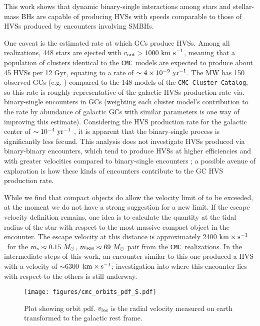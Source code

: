 \documentclass[twocolumn]{aastex631}
\newcommand{\kms}{${\rm km \times s^{-1}}$}
\newcommand{\CMC}{\texttt{CMC}}
\newcommand{\CMCcat}{\texttt{CMC Cluster Catalog}}
\begin{document}
This work shows that dynamic binary-single interactions among stars and stellar-mass BHs are capable of producing HVSs with speeds comparable to those of HVSs produced by encounters involving SMBHs.

One caveat is the estimated rate at which GCs produce HVSs.
Among all realizations, 448 stars are ejected with $v_{\rm out}>1000~{\rm km~s}^{-1}$, meaning that a population of clusters identical to the \CMC\ models are expected to produce about 45 HVSs per 12 Gyr, equating to a rate of $\sim 4 \times 10^{-9}~{\rm yr}^{-1}$.
The MW has 150 observed GCs (e.g. \citealt{2018MNRAS.478.1520B}) compared to the 148 models of the \CMCcat, so this rate is roughly representative of the galactic HVSs production rate via. binary-single encounters in GCs (weighting each cluster model's contribution to the rate by abundance of galactic GCs with similar parameters is one way of improving this estimate).
Considering the HVS production rate for the galactic center of $\sim 10^{-4}~{\rm yr}^{-1}$ \citep{2015ARA&A..53...15B}, it is apparent that the binary-single process is significantly less fecund.
This analysis does not investigate HVSs produced via binary-binary encounters, which tend to produce HVSs at higher efficiencies and with greater velocities compared to binary-single encounters \citep{1991AJ....101..562L}; a possible avenue of exploration is how these kinds of encounters contribute to the GC HVS production rate.

While we find that compact objects do allow the velocity limit of \citet{1991AJ....101..562L} to be exceeded, at the moment we do not have a strong suggestion for a new limit.
If the escape velocity definition remains, one idea is to calculate the quantity at the tidal radius of the star with respect to the most massive compact object in the encounter.
The escape velocity at this distance is approximately 2400 \kms\ for the $m_{\rm s}\approx0.15~M_\odot$, $m_{\rm BH}\approx69~M_\odot$ pair from the \CMC\ realizations.
In the intermediate steps of this work, an encounter similar to this one produced a HVS with a velocity of $\sim$6300~\kms; investigation into where this encounter lies with respect to the others is still underway.


\begin{figure}
    \begin{centering}
        \texttt{[image: figures/cmc\_orbits\_pdf\_S.pdf]}
        \caption{
            Plot showing orbit pdf.
            $v_{\rm los}$ is the radial velocity measured on earth transformed to the galactic rest frame.
        }
        \label{fig:cmc_orbits_pdf}
    \end{centering}
\end{figure}
\end{document}
